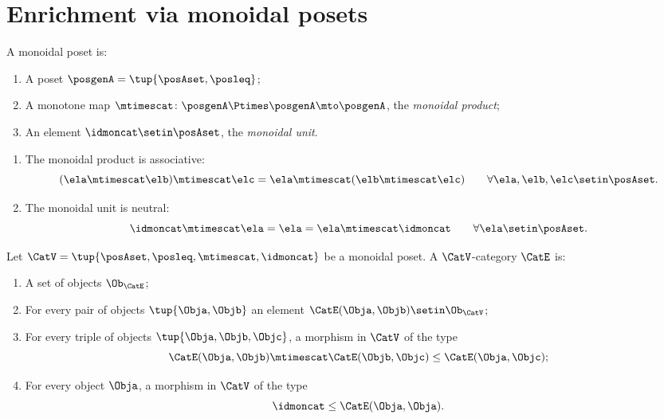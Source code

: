 
\section{Enrichment via monoidal posets}
\label{sec:quantale-enrichment}


\begin{ctdefinition}
\label{def:monoidal-poset-again}
A monoidal poset is: 

\constit
\begin{enumerate}
\item A poset $\posgenA = \tup{\posAset, \posleq}$;
\item A monotone map $\mtimescat \colon \posgenA \Ptimes \posgenA \mto \posgenA$, the \emph{monoidal product}; 
\item An element $\idmoncat \setin \posAset$, the \emph{monoidal unit}. 
\end{enumerate}

\condit
\begin{enumerate}
\item The monoidal product is associative: 
\begin{equation}
(\ela \mtimescat \elb) \mtimescat \elc = \ela \mtimescat (\elb \mtimescat \elc) \qquad \forall \ela, \elb, \elc \setin \posAset.
\end{equation}
\item The monoidal unit is neutral:
\begin{equation}
\idmoncat \mtimescat \ela = \ela = \ela \mtimescat \idmoncat \qquad \forall \ela \setin \posAset.
\end{equation}
 
\end{enumerate}


\end{ctdefinition}


\begin{ctdefinition}
\label{def:enriched-cat-monoidal-poset}
Let $\CatV = \tup{\posAset, \posleq, \mtimescat, \idmoncat}$ be a monoidal poset. A $\CatV$-category $\CatE$ is:

\constit
\begin{enumerate}
\item A set of objects $\Ob_\CatE$; 
\item For every pair of objects $\tup{\Obja, \Objb}$ an element $\CatE(\Obja, \Objb) \setin \Ob_\CatV$; 
\item For every triple of objects $\tup{\Obja, \Objb, \Objc}$, a morphism in $\CatV$ of the type
\begin{equation}
\CatE(\Obja, \Objb) \mtimescat \CatE(\Objb, \Objc) \leq \CatE(\Obja, \Objc);
\end{equation}
\item For every object $\Obja$, a morphism in $\CatV$ of the type
\begin{equation}
\idmoncat \leq \CatE(\Obja, \Obja).
\end{equation}
\end{enumerate}
\end{ctdefinition}

